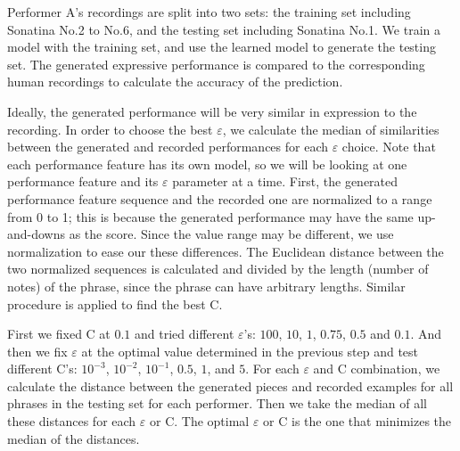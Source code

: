 Performer A's recordings are split into two sets: the training set including Sonatina No.2 to No.6, and the testing set including Sonatina No.1. We train a model with the training set, and use the learned model to generate the testing set. The generated expressive performance is compared to the corresponding human recordings to calculate the accuracy of the prediction.



Ideally, the generated performance will be very similar in expression to the recording. In order to choose the best $\varepsilon$, we calculate the median of similarities between the generated and recorded performances for each $\varepsilon$ choice. Note that each performance feature has its own model, so we will be looking at one performance feature and its $\varepsilon$  parameter at a time. 
First, the generated performance feature sequence and the recorded one are normalized to a range from 0 to 1; this is because the generated performance may have the same up-and-downs as the score. Since the value range may be different, we use normalization to ease our these differences. The Euclidean distance between the two normalized sequences is calculated and divided by the length (number of notes) of the phrase, since the phrase can have arbitrary lengths. Similar procedure is applied to find the best C.


First we fixed C at $0.1$ and tried different $\varepsilon$'s: $100$, $10$, $1$, $0.75$, $0.5$ and $0.1$. And then we fix $\varepsilon$ at the optimal value determined in the previous step and test different C's: $10^{-3}$, $10^{-2}$, $10^{-1}$, $0.5$, $1$, and $5$. For each $\varepsilon$ and C combination, we calculate the distance between the generated pieces and recorded examples for all phrases in the testing set for each performer. Then we take the median of all these distances for each $\varepsilon$ or C. The optimal $\varepsilon$ or C is the one that minimizes the median of the distances.


